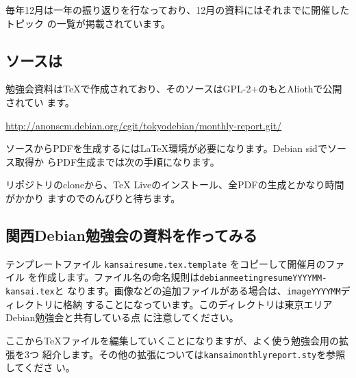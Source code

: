 \documentclass[mingoth,a4paper]{jsarticle}
\begin{document}
毎年12月は一年の振り返りを行なっており、12月の資料にはそれまでに開催したトピック
の一覧が掲載されています。

\subsection{ソースは}

勉強会資料は\TeX{}で作成されており、そのソースはGPL-2+のもとAliothで公開されてい
ます。

\url{http://anonscm.debian.org/cgit/tokyodebian/monthly-report.git/}

ソースからPDFを生成するには\LaTeX{}環境が必要になります。Debian sidでソース取得か
らPDF生成までは次の手順になります。


リポジトリのcloneから、\TeX{} Liveのインストール、全PDFの生成とかなり時間がかかり
ますのでのんびりと待ちます。

\subsection{関西Debian勉強会の資料を作ってみる}

テンプレートファイル {\tt kansairesume.tex.template} をコピーして開催月のファイル
を作成します。ファイル名の命名規則は{\tt debianmeetingresumeYYYYMM-kansai.tex}と
なります。画像などの追加ファイルがある場合は、{\tt imageYYYYMM}ディレクトリに格納
することになっています。このディレクトリは東京エリアDebian勉強会と共有している点
に注意してください。

ここから\TeX{}ファイルを編集していくことになりますが、よく使う勉強会用の拡張を3つ
紹介します。その他の拡張については{\tt kansaimonthlyreport.sty}を参照してくださ
い。
\end{document}
